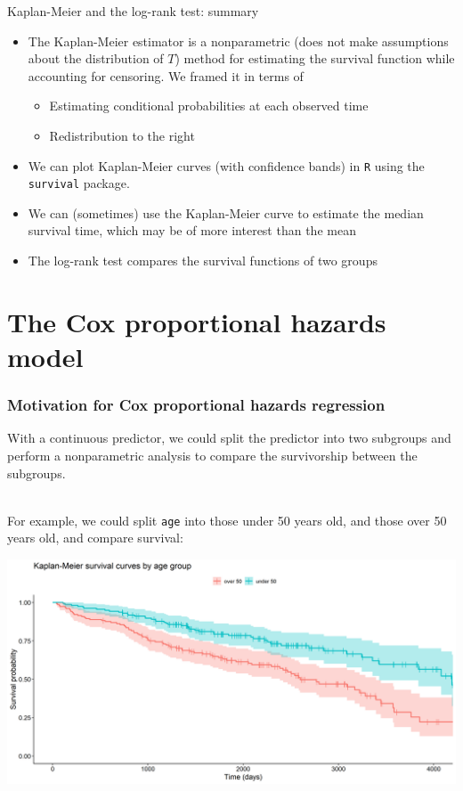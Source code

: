 \documentclass[10pt,t]{beamer}
\begin{document}
\begin{frame}{Kaplan-Meier and the log-rank test: summary}
	\begin{itemize}
		\item The Kaplan-Meier estimator is a nonparametric (does not make assumptions about the distribution of $T$) method for estimating the survival function while accounting for censoring. We framed it in terms of
		
		\medskip
		\begin{itemize}
			\item Estimating conditional probabilities at each observed time
			
			\medskip
			\item Redistribution to the right
		\end{itemize}
	\medskip
		\item We can plot Kaplan-Meier curves (with confidence bands) in \texttt{R} using the \texttt{survival} package.
		
		\medskip 
		\item We can (sometimes) use the Kaplan-Meier curve to estimate the median survival time, which may be of more interest than the mean
		
		\medskip
		\item The log-rank test compares the survival functions of two groups
	\end{itemize}
\end{frame}

\section{The Cox proportional hazards model}
\begin{frame}
\frametitle{Motivation for Cox proportional hazards regression}
\vspace{-0.8cm}
With a continuous predictor, we could split the predictor into two subgroups and perform a nonparametric analysis to compare the survivorship between the subgroups.
\\ ~\ 

For example, we could split \texttt{age} into those under 50 years old, and those over 50 years old, and compare survival:

\begin{center}
\includegraphics[width = \textwidth]{figs/KM_strat_age.png}
\end{center}
\end{frame}
\end{document}
